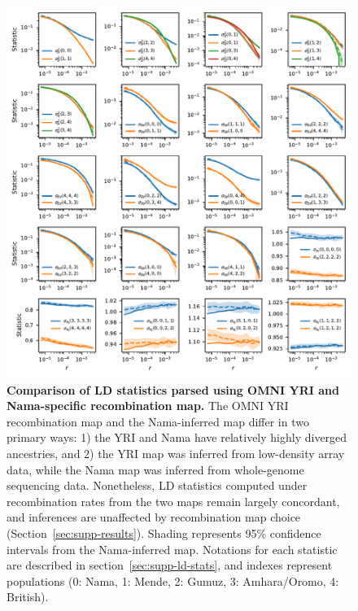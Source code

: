 \documentclass[]{article}
\begin{document}
\begin{figure}[ht]
    \centering
    \includegraphics{figures/supp-omni-nama-comparison.pdf}
    \caption{
        \textbf{Comparison of LD statistics parsed using OMNI YRI and
        Nama-specific recombination map.}
        The OMNI YRI recombination map and the Nama-inferred map
        \citep{Van_Eeden2022-od} differ in two primary ways: 1) the YRI and
        Nama have relatively highly diverged ancestries, and 2) the YRI
        map was inferred from low-density array data, while the Nama map
        was inferred from whole-genome sequencing data.
        Nonetheless, LD statistics computed under recombination rates from
        the two maps remain largely concordant, and inferences are
        unaffected by recombination map choice (Section~\ref{sec:supp-results}).
        Shading represents 95\% confidence intervals from the Nama-inferred
        map. Notations for each statistic are described in
        section~\ref{sec:supp-ld-stats}, and indexes represent populations
        (0: Nama, 1: Mende, 2: Gumuz, 3: Amhara/Oromo, 4: British).
    }
    \label{fig:supp-omni-nama-comparison}
\end{figure}
\end{document}
